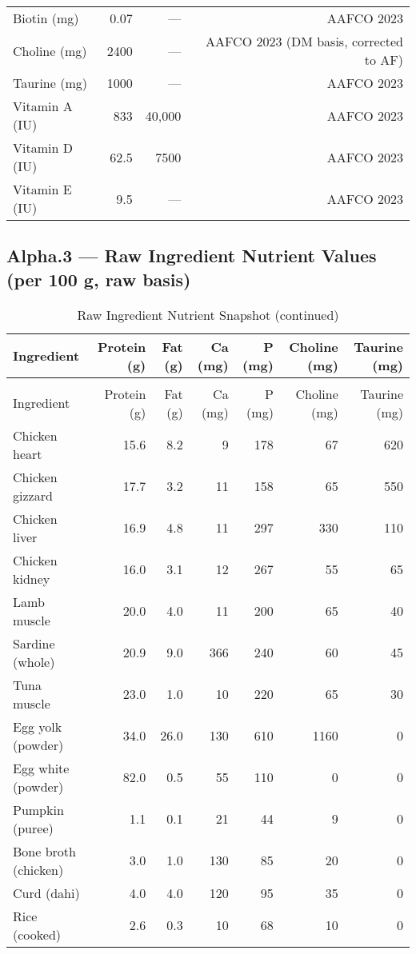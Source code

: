 \begin{center}
\begin{minipage}{\textwidth}
\begin{longtable}{p{4cm} r r r}
Biotin (mg) & 0.07 & --- & AAFCO 2023 \\
Choline (mg) & 2400 & --- & AAFCO 2023 (DM basis, corrected to AF) \\
Taurine (mg) & 1000 & --- & AAFCO 2023 \\
Vitamin A (IU) & 833 & 40,000 & AAFCO 2023 \\
Vitamin D (IU) & 62.5 & 7500 & AAFCO 2023 \\
Vitamin E (IU) & 9.5 & --- & AAFCO 2023 \\
\bottomrule
\end{longtable}
\end{minipage}
\end{center}

\subsection*{Alpha.3 --- Raw Ingredient Nutrient Values (per 100 g, raw basis)}
\begin{center}
\begin{minipage}{\textwidth}
\begin{longtable}{p{3.6cm} r r r r r r}
\caption{Raw Ingredient Nutrient Snapshot}\\
\toprule
Ingredient & Protein (g) & Fat (g) & Ca (mg) & P (mg) & Choline (mg) & Taurine (mg) \\
\midrule
\endfirsthead
\caption{Raw Ingredient Nutrient Snapshot (continued)}\\
\toprule
Ingredient & Protein (g) & Fat (g) & Ca (mg) & P (mg) & Choline (mg) & Taurine (mg) \\
\midrule
\endhead
Chicken heart & 15.6 & 8.2 & 9 & 178 & 67 & 620 \\
Chicken gizzard & 17.7 & 3.2 & 11 & 158 & 65 & 550 \\
Chicken liver & 16.9 & 4.8 & 11 & 297 & 330 & 110 \\
Chicken kidney & 16.0 & 3.1 & 12 & 267 & 55 & 65 \\
Lamb muscle & 20.0 & 4.0 & 11 & 200 & 65 & 40 \\
Sardine (whole) & 20.9 & 9.0 & 366 & 240 & 60 & 45 \\
Tuna muscle & 23.0 & 1.0 & 10 & 220 & 65 & 30 \\
Egg yolk (powder) & 34.0 & 26.0 & 130 & 610 & 1160 & 0 \\
Egg white (powder) & 82.0 & 0.5 & 55 & 110 & 0 & 0 \\
Pumpkin (puree) & 1.1 & 0.1 & 21 & 44 & 9 & 0 \\
Bone broth (chicken) & 3.0 & 1.0 & 130 & 85 & 20 & 0 \\
Curd (dahi) & 4.0 & 4.0 & 120 & 95 & 35 & 0 \\
Rice (cooked) & 2.6 & 0.3 & 10 & 68 & 10 & 0 \\
\bottomrule
\end{longtable}
\end{minipage}
\end{center}

